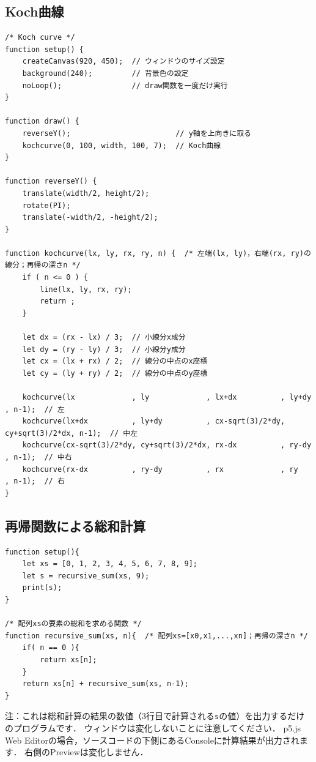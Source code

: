 \documentclass[dvipdfmx]{jsarticle}
\theoremstyle{definition}
\begin{document}
\subsection{Koch曲線}  \label{subsec_code_koch_curve}
\begin{lstlisting}[caption=Koch曲線, label=code_koch_curve_all]
/* Koch curve */
function setup() {
    createCanvas(920, 450);  // ウィンドウのサイズ設定
    background(240);         // 背景色の設定
    noLoop();                // draw関数を一度だけ実行
}

function draw() {
    reverseY();                        // y軸を上向きに取る
    kochcurve(0, 100, width, 100, 7);  // Koch曲線
}

function reverseY() {
    translate(width/2, height/2);
    rotate(PI);
    translate(-width/2, -height/2);
}

function kochcurve(lx, ly, rx, ry, n) {  /* 左端(lx, ly)，右端(rx, ry)の線分；再帰の深さn */
    if ( n <= 0 ) {
        line(lx, ly, rx, ry);
        return ;
    }

    let dx = (rx - lx) / 3;  // 小線分x成分
    let dy = (ry - ly) / 3;  // 小線分y成分
    let cx = (lx + rx) / 2;  // 線分の中点のx座標
    let cy = (ly + ry) / 2;  // 線分の中点のy座標

    kochcurve(lx             , ly             , lx+dx          , ly+dy          , n-1);  // 左
    kochcurve(lx+dx          , ly+dy          , cx-sqrt(3)/2*dy, cy+sqrt(3)/2*dx, n-1);  // 中左
    kochcurve(cx-sqrt(3)/2*dy, cy+sqrt(3)/2*dx, rx-dx          , ry-dy          , n-1);  // 中右
    kochcurve(rx-dx          , ry-dy          , rx             , ry             , n-1);  // 右
}
\end{lstlisting}
\clearpage

\subsection{再帰関数による総和計算}  \label{subsec_code_recursive_sum}
\begin{lstlisting}[caption=再帰関数による総和計算, label=code_recursive_sum_all]
function setup(){
    let xs = [0, 1, 2, 3, 4, 5, 6, 7, 8, 9];
    let s = recursive_sum(xs, 9);
    print(s);
}

/* 配列xsの要素の総和を求める関数 */
function recursive_sum(xs, n){  /* 配列xs=[x0,x1,...,xn]；再帰の深さn */
    if( n == 0 ){
        return xs[n];
    }
    return xs[n] + recursive_sum(xs, n-1);
}
\end{lstlisting}
注：これは総和計算の結果の数値（3行目で計算される\verb|s|の値）を出力するだけのプログラムです．
ウィンドウは変化しないことに注意してください．
p5.js Web Editorの場合，ソースコードの下側にあるConsoleに計算結果が出力されます．
右側のPreviewは変化しません．
\clearpage
\end{document}
